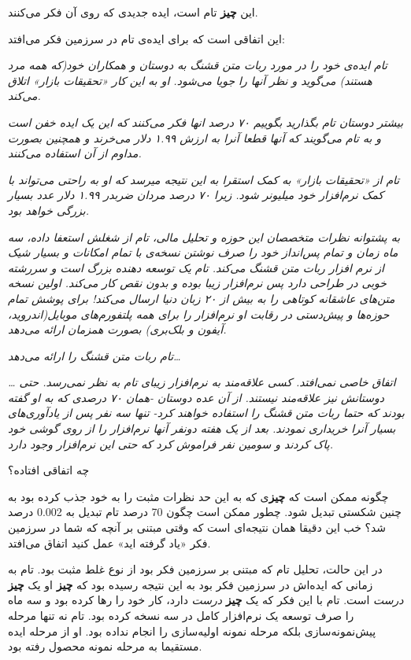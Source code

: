این \textbf{چیز} تام است، ایده جدیدی که روی آن فکر می‌کنند.

این اتفاقی است که برای ایده‌ی تام در سرزمین فکر می‌افتد:

\emph{تام ایده‌ی خود را در مورد ربات متن قشنگ به دوستان و همکاران خود(که
همه مرد هستند) می‌گوید و نظر آنها را جویا می‌شود. او به این کار «تحقیقات
بازار» اتلاق می‌کند.}

\emph{بیشتر دوستان تام بگذارید بگوییم ۷۰ درصد انها فکر می‌کنند که این یک
ایده خفن است و به تام می‌گویند که آنها قطعا آنرا به ارزش ۱.۹۹ دلار
می‌خرند و همچنین بصورت مداوم از آن استفاده می‌کنند.}

\emph{تام از «تحقیقات بازار» به کمک استقرا به این نتیجه میرسد که او به
راحتی می‌تواند با کمک نرم‌افزار خود میلیونر شود. زیرا ۷۰ درصد مردان
ضربدر ۱.۹۹ دلار عدد بسیار بزرگی خواهد بود.}

\emph{به پشتوانه نظرات متخصصان این حوزه و تحلیل مالی، تام از شغلش استعفا
داده، سه ماه زمان و تمام پس‌انداز خود را صرف نوشتن نسخه‌ی با تمام
امکانات و بسیار شیک از نرم افزار ربات متن قشنگ می‌کند. تام یک توسعه
دهنده بزرگ است و سررشته خوبی در طراحی دارد پس نرم‌افزار زیبا بوده و بدون
نقص کار می‌کند. اولین نسخه متن‌های عاشقانه کوتاهی را به بیش از ۲۰ زبان
دنیا ارسال می‌کند! برای پوشش تمام حوزه‌ها و پیش‌دستی در رقابت او
نرم‌افزار را برای همه پلتفورم‌های موبایل(اندروید، آیفون و بلک‌بری) بصورت
همزمان ارائه می‌دهد.}

\emph{تام ربات متن قشنگ را ارائه می‌دهد\ldots{}}

\emph{\ldots{} اتفاق خاصی نمی‌افتد. کسی علاقه‌مند به نرم‌افزار زیبای تام
به نظر نمی‌رسد. حتی دوستانش نیز علاقه‌مند نیستند. از آن عده دوستان -همان
۷۰ درصدی که به او گفته بودند که حتما ربات متن قشنگ را استفاده خواهند
کرد- تنها سه نفر پس از یادآوری‌های بسیار آنرا خریداری نمودند. بعد از یک
هفته دونفر آنها نرم‌افزار را از روی گوشی خود پاک کردند و سومین نفر
فراموش کرد که حتی این نرم‌افزار وجود دارد.}

چه اتفاقی افتاده؟

چگونه ممکن است که \textbf{چیز}ی که به این حد نظرات مثبت را به خود جذب
کرده بود به چنین شکستی تبدیل شود. چطور ممکن است چگون 70 درصد تام تبدیل
به 0.002 درصد شد؟ خب این دقیقا همان نتیجه‌ای است که وقتی مبتنی بر آنچه
که شما در سرزمین فکر «یاد گرفته اید» عمل کنید اتفاق می‌افتد.

در این حالت، تحلیل تام که مبتنی بر سرزمین فکر بود از نوع غلط مثبت بود.
تام به زمانی که ایده‌اش در سرزمین فکر بود به این نتیجه رسیده بود که
\textbf{چیز} او یک \textbf{چیز} \emph{درست} است. تام با این فکر که یک
\textbf{چیز} \emph{درست} دارد، کار خود را رها کرده بود و سه ماه را صرف
توسعه یک نرم‌افزار کامل در سه نسخه کرده بود. تام نه تنها مرحله
پیش‌نمونه‌سازی بلکه مرحله نمونه اولیه‌سازی را انجام نداده بود. او از
مرحله ایده مستقیما به مرحله نمونه محصول رفته بود.

